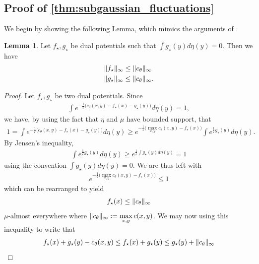 \documentclass{article}
\DeclarePairedDelimiter\norm{\lVert}{\rVert}%
\theoremstyle{definition}
\newtheorem{lemma}[theorem]{Lemma}
\begin{document}
\subsection{Proof of \cref{thm:subgaussian_fluctuations}}
\label{ssec:proof_bounded_deviation}
We begin by showing the following Lemma, which mimics the arguments of \citet{rigollet2022sample}.
\begin{lemma}
    Let $f_\star,g_\star$ be dual potentials such that $\int g_\star(y)d\eta(y)  = 0$. Then we have 
    \begin{align*}
         & \norm{f_\star}_\infty \leq \norm{c_\theta}_\infty\\
        & \norm{g_\star}_\infty \leq \norm{c_\theta}_\infty.
    \end{align*}
\end{lemma}
\begin{proof}
    Let $f_\star,g_\star$ be two dual potentials. Since 
    \begin{align*}
        \int e^{-\frac{1}{\varepsilon}\big(c_\theta(x,y)-f_\star(x)-g_\star(y)\big)}d\eta(y) = 1,
    \end{align*}
    we have, by using the fact that $\eta$ and $\mu$ have bounded support, that 
    \begin{align*}
        1 = \int e^{-\frac{1}{\varepsilon}\big(c_\theta(x,y)-f_\star(x)-g_\star(y)\big)}d\eta(y) \geq e^{-\frac{1}{\varepsilon}\big(\max\limits_{x,y}c_\theta(x,y)-f_\star(x)\big)} \int e^{\frac{1}{\varepsilon}g_\star(y)}d \eta(y).
    \end{align*}
    By Jensen's inequality,
    \begin{align*}
        \int e^{\frac{1}{\varepsilon}g_\star(y)}d \eta(y) \geq e^{\frac{1}{\varepsilon}\int g_\star(y)d\eta(y) } = 1
    \end{align*}
    using the convention $\int g_\star(y)d\eta(y) = 0$. We are thus left with 
    \begin{align*}
        e^{-\frac{1}{\varepsilon}\big(\max\limits_{x,y}c_\theta(x,y)-f_\star(x)\big)} \leq 1
    \end{align*}
    which can be rearranged to yield
    \begin{align*}
        f_\star(x) \leq \norm{c_\theta}_\infty
    \end{align*}
    $\mu$-almost everywhere where $\norm{c_\theta}_\infty := \max\limits_{x,y} c(x,y)$. We may now using this inequality to write that 
    \begin{align*}
        f_\star(x)+g_\star(y)-c_\theta(x,y) \leq f_\star(x)+g_\star(y) \leq g_\star(y) + \norm{c_\theta}_\infty

\end{align*}
\end{proof}
\end{document}
